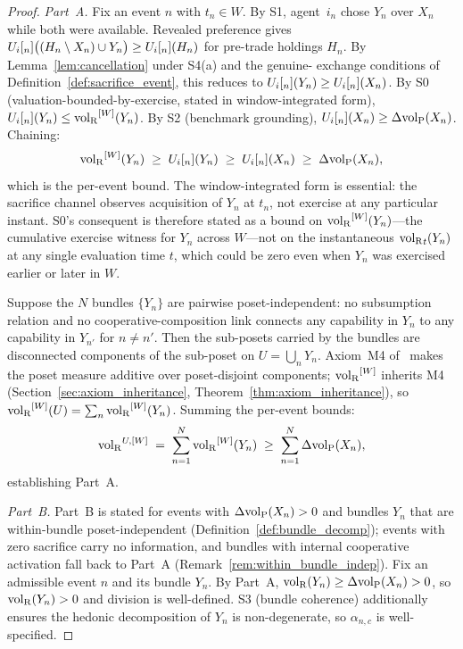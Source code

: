 \begin{proof}
\emph{Part~A.}
Fix an event $n$ with $t_n \in W$.  By S1, agent~$i_n$ chose
$Y_n$ over $X_n$ while both were available.  Revealed preference
gives $U_i[_n]\bigl((H_n \setminus X_n) \cup Y_n\bigr) \geq
U_i[_n](H_n)$ for pre-trade holdings $H_n$.  By
Lemma~\ref{lem:cancellation} under S4(a) and the genuine-
exchange conditions of Definition~\ref{def:sacrifice_event},
this reduces to $U_i[_{n}](Y_n) \geq U_i[_{n}](X_n)$.  By S0
(valuation-bounded-by-exercise, stated in window-integrated
form), $U_i[_{n}](Y_n) \leq {\operatorname{vol}_{\mathrm{R}}}^{[W]}(Y_n)$.  By S2
(benchmark grounding), $U_i[_{n}](X_n) \geq \Delta{\operatorname{vol}_{\mathrm{P}}}(X_n)$.
Chaining:
\[
  {\operatorname{vol}_{\mathrm{R}}}^{[W]}(Y_n) \;\geq\; U_i[_{n}](Y_n)
  \;\geq\; U_i[_{n}](X_n)
  \;\geq\; \Delta{\operatorname{vol}_{\mathrm{P}}}(X_n),
\]
which is the per-event bound.  The window-integrated form is
essential: the sacrifice channel observes acquisition of $Y_n$
at $t_n$, not exercise at any particular instant.  S0's
consequent is therefore stated as a bound on
${\operatorname{vol}_{\mathrm{R}}}^{[W]}(Y_n)$---the cumulative exercise witness for $Y_n$
across $W$---not on the instantaneous ${\operatorname{vol}_{\mathrm{R}}}_t(Y_n)$ at any
single evaluation time $t$, which could be zero even when
$Y_n$ was exercised earlier or later in $W$.

Suppose the $N$ bundles $\{Y_n\}$ are pairwise poset-independent:
no subsumption relation and no cooperative-composition link
connects any capability in $Y_n$ to any capability in $Y_{n'}$
for $n \neq n'$.  Then the sub-posets carried by the bundles are
disconnected components of the sub-poset on
$U = \bigcup_n Y_n$.  Axiom~M4
of~\citep[Proposition~1]{lasser2026poset} makes the poset
measure additive over poset-disjoint components; ${\operatorname{vol}_{\mathrm{R}}}^{[W]}$
inherits M4 (Section~\ref{sec:axiom_inheritance},
Theorem~\ref{thm:axiom_inheritance}), so
${\operatorname{vol}_{\mathrm{R}}}^{[W]}(U) = \sum_n {\operatorname{vol}_{\mathrm{R}}}^{[W]}(Y_n)$.  Summing the
per-event bounds:
\[
  {\operatorname{vol}_{\mathrm{R}}}^{U,[W]} \;=\; \sum_{n=1}^N {\operatorname{vol}_{\mathrm{R}}}^{[W]}(Y_n)
  \;\geq\; \sum_{n=1}^N \Delta{\operatorname{vol}_{\mathrm{P}}}(X_n),
\]
establishing Part~A.

\emph{Part~B.}
Part~B is stated for events with $\Delta{\operatorname{vol}_{\mathrm{P}}}(X_n) > 0$ and
bundles $Y_n$ that are within-bundle poset-independent
(Definition~\ref{def:bundle_decomp}); events with zero sacrifice
carry no information, and bundles with internal cooperative
activation fall back to Part~A
(Remark~\ref{rem:within_bundle_indep}).  Fix an admissible event
$n$ and its bundle $Y_n$.  By Part~A, ${\operatorname{vol}_{\mathrm{R}}}(Y_n) \geq
\Delta{\operatorname{vol}_{\mathrm{P}}}(X_n) > 0$, so ${\operatorname{vol}_{\mathrm{R}}}(Y_n) > 0$ and division is
well-defined.  S3 (bundle coherence) additionally ensures the
hedonic decomposition of $Y_n$ is non-degenerate, so
$\alpha_{n,c}$ is well-specified.


\end{proof}
